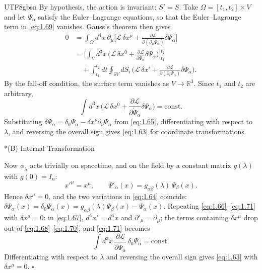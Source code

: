 \documentclass[11pt,a4paper,oneside]{report}
\makeatletter
\newcommand\topic{\@startsection{paragraph}{4}{\z@}{-1.7ex plus -.3ex}{.5ex}{\normalfont\normalsize\bfseries\itshape\boldmath}*}
\makeatother
\begin{document}
\begin{CJK*}{UTF8}{gbsn}
By hypothesis, the action is invariant: $S'=S$. Take $\Omega=[t_1,t_2]\times V$ and let $\Psi_\alpha$ satisfy the Euler–Lagrange equations, so that the Euler–Lagrange term in \eqref{eq:1.69} vanishes. Gauss's theorem then gives
\begin{equation*}
\begin{aligned}
0
&=\int_\Omega d^4x\,\partial_\mu\biggl[
\mathcal L\,\delta x^\mu
+\frac{\partial\mathcal L}{\partial(\partial_\mu\Psi_\alpha)}\delta\Psi_\alpha
\biggr]\\
&=\biggl[\int_V d^3x\,\biggl(
\mathcal L\,\delta x^0
+\frac{\partial\mathcal L}{\partial\dot\Psi_\alpha}\delta\Psi_\alpha
\biggr)\biggr]_{t_1}^{t_2}\\
&\quad
+\int_{t_1}^{t_2}dt\oint_{\partial V}dS_i\,\biggl(
\mathcal L\,\delta x^i
+\frac{\partial\mathcal L}{\partial(\partial_i\Psi_\alpha)}\delta\Psi_\alpha
\biggr).
\end{aligned}
\tag{1.70}\label{eq:1.70}
\end{equation*}
By the fall-off condition, the surface term vanishes as $V\to\mathbb R^3$. Since $t_1$ and $t_2$ are arbitrary,
\begin{equation*}
\int d^3x\,\biggl(
\mathcal L\,\delta x^0
+\frac{\partial\mathcal L}{\partial\dot\Psi_\alpha}\delta\Psi_\alpha
\biggr)=\text{const}.
\tag{1.71}\label{eq:1.71}
\end{equation*}
Substituting $\delta\Psi_\alpha=\delta_0\Psi_\alpha-\delta x^\nu\partial_\nu\Psi_\alpha$ from \eqref{eq:1.65}, differentiating with respect to $\lambda$, and reversing the overall sign gives \eqref{eq:1.63} for coordinate transformations.

\topic{(B) Internal Transformation}

Now $\phi_\lambda$ acts trivially on spacetime, and on the field by a constant matrix $g(\lambda)$ with $g(0)=I_n$:
\begin{equation*}
x'^\mu=x^\mu,\qquad
\Psi'_\alpha(x)=g_{\alpha\beta}(\lambda)\,\Psi_\beta(x).
\tag{1.72}\label{eq:1.72}
\end{equation*}
Hence $\delta x^\mu=0$, and the two variations in \eqref{eq:1.64} coincide: $\delta\Psi_\alpha(x)=\delta_0\Psi_\alpha(x)=g_{\alpha\beta}(\lambda)\Psi_\beta(x)-\Psi_\alpha(x)$. Repeating \eqref{eq:1.66}–\eqref{eq:1.71} with $\delta x^\mu=0$: in \eqref{eq:1.67}, $d^4x'=d^4x$ and $\partial'_\mu=\partial_\mu$; the terms containing $\delta x^\mu$ drop out of \eqref{eq:1.68}–\eqref{eq:1.70}; and \eqref{eq:1.71} becomes
\begin{equation*}
\int d^3x\,\frac{\partial\mathcal L}{\partial\dot\Psi_\alpha}\,\delta_0\Psi_\alpha=\text{const}.
\tag{1.73}\label{eq:1.73}
\end{equation*}
Differentiating with respect to $\lambda$ and reversing the overall sign gives \eqref{eq:1.63} with $\delta x^\mu=0$. $\square$


\end{CJK*}
\end{document}
